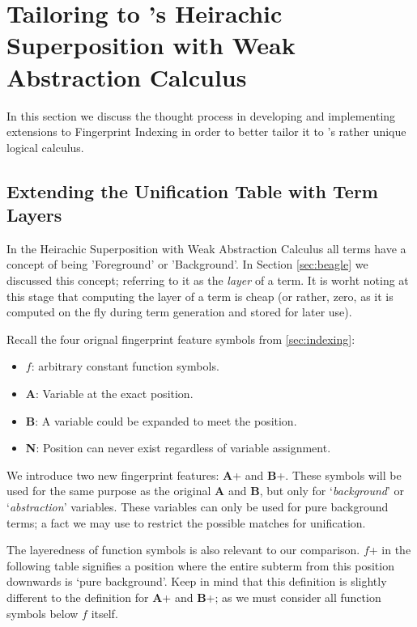 \section{Tailoring to \Beagle's Heirachic Superposition with Weak Abstraction Calculus}
\label{sec:tailored}

In this section we discuss the thought process in developing and implementing
extensions to Fingerprint Indexing in order to better tailor it to \beagle's
rather unique logical calculus.

\subsection{Extending the Unification Table with Term Layers}

In the Heirachic Superposition with Weak Abstraction Calculus all terms have 
a concept of being 'Foreground' or 'Background'. In Section \ref{sec:beagle} we
discussed this concept; referring to it as the \emph{layer} of a term. It is
worht noting at this stage that computing the layer of a term is cheap (or rather,
zero, as it is computed on the fly during term generation and stored for later use).

Recall the four orignal fingerprint feature symbols from \ref{sec:indexing}:
\begin{itemize}
\item $f$: arbitrary constant function symbols.
\item \textbf{A}: Variable at the exact position.
\item \textbf{B}: A variable could be expanded to meet the position.
\item \textbf{N}: Position can never exist regardless of variable assignment.
\end{itemize}
We introduce two new fingerprint features: \textbf{A}+ and \textbf{B}+.
These symbols will be used for the same purpose as the original \textbf{A} and \textbf{B}, but
only for `\emph{background}' or `\emph{abstraction}' variables. These variables
can only be used for pure background terms; a fact we may use to restrict the possible
matches for unification.

The layeredness of function symbols is also relevant to our comparison.
$f$+ in the following table signifies a position where the entire subterm from this position downwards
is `pure background'. Keep in mind that this definition is slightly different
to the definition for \textbf{A}+ and \textbf{B}+; as we must consider all function
symbols below $f$ itself.

